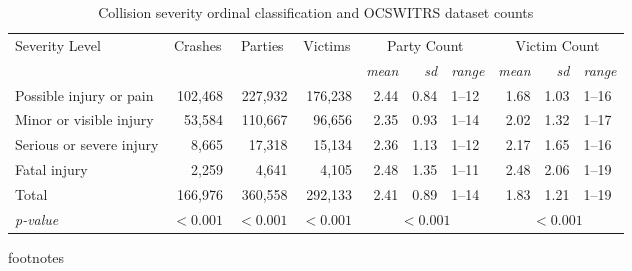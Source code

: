 \begin{table}[h]
\centering
\caption{Collision severity ordinal classification and OCSWITRS dataset counts} 
\label{Tbl1}
\begin{tabular}{lrrrrrlrrl}
  \toprule
  \multirow{2}{*}{Severity Level} & \multicolumn{1}{c}{\multirow{2}{*}{Crashes}} & \multicolumn{1}{c}{\multirow{2}{*}{Parties}} & \multicolumn{1}{c}{\multirow{2}{*}{Victims}} & \multicolumn{3}{c}{Party Count\footnotemark[1]} & \multicolumn{3}{c}{Victim Count\footnotemark[1]} \\ 
 \cmidrule{5-7}\cmidrule{8-10} 
 & & & & \textit{mean} & \textit{sd} & \textit{range} & \textit{mean} & \textit{sd} & \textit{range} \\ 
 \midrule
Possible injury or pain & 102,468 & 227,932 & 176,238 & 2.44 & 0.84 & 1--12 & 1.68 & 1.03 & 1--16 \\ 
  Minor or visible injury & 53,584 & 110,667 & 96,656 & 2.35 & 0.93 & 1--14 & 2.02 & 1.32 & 1--17 \\ 
  Serious or severe injury & 8,665 & 17,318 & 15,134 & 2.36 & 1.13 & 1--12 & 2.17 & 1.65 & 1--16 \\ 
  Fatal injury & 2,259 & 4,641 & 4,105 & 2.48 & 1.35 & 1--11 & 2.48 & 2.06 & 1--19 \\ 
   \midrule 
Total & 166,976 & 360,558 & 292,133 & 2.41 & 0.89 & 1--14 & 1.83 & 1.21 & 1--19 \\ 
   \textit{p-value} & $<0.001$\footnotemark[2] & $<0.001$\footnotemark[2] & $<0.001$\footnotemark[2] & \multicolumn{3}{c}{$<0.001$\footnotemark[3]} & \multicolumn{3}{c}{$<0.001$\footnotemark[3]} \\ 
 \bottomrule
\end{tabular}
\end{table}
footnotes \\ 
  \midrule
{} \\ 
   \\ 
   \\ 
   \bottomrule
